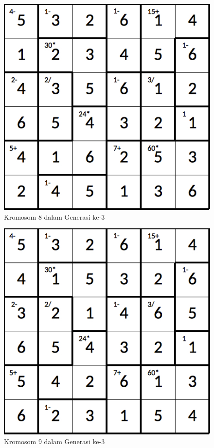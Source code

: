 \documentclass[a4paper,twoside]{article}
\begin{document}
\begin{enumerate}
\begin{figure}
\centering
\captionsetup{justification=centering}
\includegraphics[scale=0.333]{Gambar/hybridgenetic/Generation3Chromosome8}
\caption[Kromosom 8 dalam Generasi ke-3]{Kromosom 8 dalam Generasi ke-3}
\label{fig:analisisg3k8}
\end{figure}

\begin{figure}
\centering
\captionsetup{justification=centering}
\includegraphics[scale=0.333]{Gambar/hybridgenetic/Generation3Chromosome9}
\caption[Kromosom 9 dalam Generasi ke-3]{Kromosom 9 dalam Generasi ke-3}
\label{fig:analisisg3k9}
\end{figure}


\end{enumerate}
\end{document}
